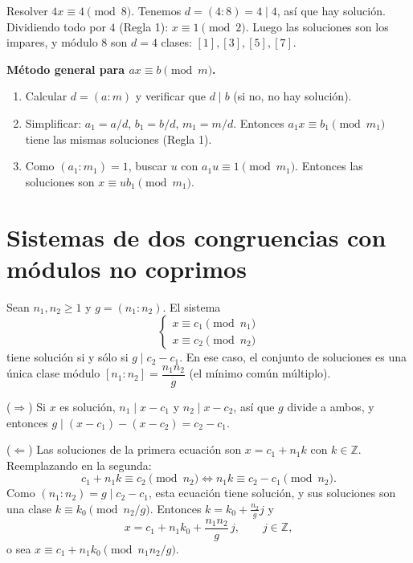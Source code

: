 \begin{ejemplo}
Resolver $4x\equiv 4 \pmod 8$. Tenemos $d=(4:8)=4\mid 4$, así que hay solución.
Dividiendo todo por $4$ (Regla 1): $x\equiv 1 \pmod 2$. Luego las soluciones son
los impares, y módulo $8$ son $d=4$ clases: $[1],[3],[5],[7]$.
\end{ejemplo}

\begin{nota}
\textbf{Método general para $ax\equiv b \pmod m$.}
\begin{enumerate}
    \item Calcular $d=(a:m)$ y verificar que $d\mid b$ (si no, no hay solución).
    \item Simplificar: $a_1=a/d$, $b_1=b/d$, $m_1=m/d$. Entonces
    $a_1x\equiv b_1 \pmod{m_1}$ tiene las mismas soluciones (Regla 1).
    \item Como $(a_1:m_1)=1$, buscar $u$ con $a_1u\equiv 1 \pmod{m_1}$. Entonces las
    soluciones son $x\equiv ub_1 \pmod{m_1}$.
\end{enumerate}
\end{nota}

\section{Sistemas de dos congruencias con módulos no coprimos}

\begin{proposicion}
Sean $n_1,n_2\ge 1$ y $g=(n_1:n_2)$. El sistema
\[
\begin{cases}
x\equiv c_1 \pmod{n_1}\\
x\equiv c_2 \pmod{n_2}
\end{cases}
\]
tiene solución si y sólo si $g\mid c_2-c_1$. En ese caso, el conjunto de
soluciones es una única clase módulo $[n_1:n_2]=\dfrac{n_1n_2}{g}$ (el mínimo
común múltiplo).
\end{proposicion}

\begin{demostracion}
($\Rightarrow$) Si $x$ es solución, $n_1\mid x-c_1$ y $n_2\mid x-c_2$, así que
$g$ divide a ambos, y entonces $g\mid (x-c_1)-(x-c_2)=c_2-c_1$.

($\Leftarrow$) Las soluciones de la primera ecuación son $x=c_1+n_1k$ con
$k\in\mathbb{Z}$. Reemplazando en la segunda:
\[
c_1+n_1k\equiv c_2 \pmod{n_2} \iff n_1k\equiv c_2-c_1 \pmod{n_2}.
\]
Como $(n_1:n_2)=g\mid c_2-c_1$, esta ecuación tiene solución, y sus soluciones
son una clase $k\equiv k_0 \pmod{n_2/g}$. Entonces $k=k_0+\frac{n_2}{g}j$ y
\[
x=c_1+n_1k_0+\frac{n_1n_2}{g}\,j, \qquad j\in\mathbb{Z},
\]
o sea $x\equiv c_1+n_1k_0 \pmod{n_1n_2/g}$.
\end{demostracion}


